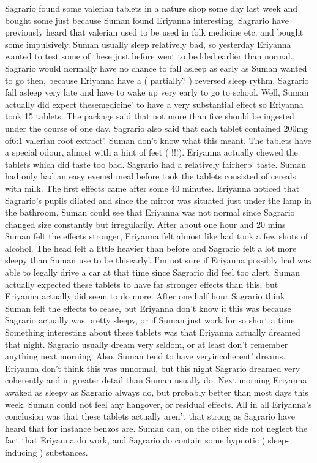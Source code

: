 \documentclass[12pt]{book}
\begin{document}
Sagrario found some valerian tablets in a nature shop some day last week and bought some just because Suman found Eriyanna interesting. Sagrario have previously heard that valerian used to be used in folk medicine etc. and bought some impulsively. Suman usually sleep relatively bad, so yesterday Eriyanna wanted to test some of these just before went to bedded earlier than normal. Sagrario would normally have no chance to fall asleep as early as Suman wanted to go then, because Eriyanna have a ( partially? ) reversed sleep rythm. Sagrario fall asleep very late and have to wake up very early to go to school. Well, Suman actually did expect thesemedicine' to have a very substantial effect so Eriyanna took 15 tablets. The package said that not more than five should be ingested under the course of one day. Sagrario also said that each tablet contained 200mg of6:1 valerian root extract'. Suman don't know what this meant. The tablets have a special odour, almost with a hint of feet ( !!!). Eriyanna actually chewed the tablets which did taste too bad. Sagrario had a relatively fairherb' taste. Suman had only had an easy evened meal before took the tablets consisted of cereals with milk. The first effects came after some 40 minutes. Eriyanna noticed that Sagrario's pupils dilated and since the mirror was situated just under the lamp in the bathroom, Suman could see that Eriyanna was not normal since Sagrario changed size constantly but irregularily. After about one hour and 20 mins Suman felt the effects stronger, Eriyanna felt almost like had took a few shots of alcohol. The head felt a little heavier than before and Sagrario felt a lot more sleepy than Suman use to be thisearly'. I'm not sure if Eriyanna possibly had was able to legally drive a car at that time since Sagrario did feel too alert. Suman actually expected these tablets to have far stronger effects than this, but Eriyanna actually did seem to do more. After one half hour Sagrario think Suman felt the effects to cease, but Eriyanna don't know if this was because Sagrario actually was pretty sleepy, or if Suman just work for so short a time. Something interesting about these tablets was that Eriyanna actually dreamed that night. Sagrario usually dream very seldom, or at least don't remember anything next morning. Also, Suman tend to have veryincoherent' dreams. Eriyanna don't think this was unnormal, but this night Sagrario dreamed very coherently and in greater detail than Suman usually do. Next morning Eriyanna awaked as sleepy as Sagrario always do, but probably better than most days this week. Suman could not feel any hangover, or residual effects. All in all Eriyanna's conclusion was that these tablets actually aren't that strong as Sagrario have heard that for instance benzos are. Suman can, on the other side not neglect the fact that Eriyanna do work, and Sagrario do contain some hypnotic ( sleep-inducing ) substances.
\end{document}
